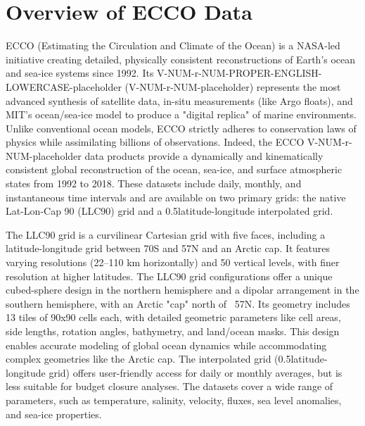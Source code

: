 \pagebreak
\section{Overview of ECCO Data}

\par\vspace{0.25cm}
ECCO (Estimating the Circulation and Climate of the Ocean) is a NASA-led initiative creating detailed, physically consistent reconstructions of Earth's ocean and sea-ice systems since 1992. Its V-NUM-r-NUM-PROPER-ENGLISH-LOWERCASE-placeholder (V-NUM-r-NUM-placeholder) represents the most advanced synthesis of satellite data, in-situ measurements (like Argo floats), and MIT's ocean/sea-ice model to produce a "digital replica" of marine environments. Unlike conventional ocean models, ECCO strictly adheres to conservation laws of physics while assimilating billions of observations. Indeed, the ECCO V-NUM-r-NUM-placeholder data products provide a dynamically and kinematically consistent global reconstruction of the ocean, sea-ice, and surface atmospheric states from 1992 to 2018. These datasets include daily, monthly, and instantaneous time intervals and are available on two primary grids: the native Lat-Lon-Cap 90 (LLC90) grid and a 0.5\textdegree latitude-longitude interpolated grid. 

\par\vspace{0.25cm}
The LLC90 grid is a curvilinear Cartesian grid with five faces, including a latitude-longitude grid between 70\textdegree S and 57\textdegree N and an Arctic cap. It features varying resolutions (22–110 km horizontally) and 50 vertical levels, with finer resolution at higher latitudes. The LLC90 grid configurations offer a unique cubed-sphere design in the northern hemisphere and a dipolar arrangement in the southern hemisphere, with an Arctic "cap" north of ~57\textdegree N. Its geometry includes 13 tiles of 90x90 cells each, with detailed geometric parameters like cell areas, side lengths, rotation angles, bathymetry, and land/ocean masks. This design enables accurate modeling of global ocean dynamics while accommodating complex geometries like the Arctic cap.
The interpolated grid (0.5\textdegree latitude-longitude grid) offers user-friendly access for daily or monthly averages, but is less suitable for budget closure analyses. The datasets cover a wide range of parameters, such as temperature, salinity, velocity, fluxes, sea level anomalies, and sea-ice properties.

